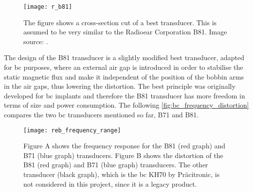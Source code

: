  \begin{figure}[H]
	\centering
		\texttt{[image: r\_b81]}
		\caption{The figure shows a cross-section cut of a \gls{best} transducer. This is assumed to be very similar to the Radioear Corporation B81. Image source:  \citep{the_balanced_2003}.}
		\label{fig:r_b81}
\end{figure}

The design of the B81 transducer is a slightly modified \gls{best} transducer, adapted for \gls{bc} purposes, where an external air gap is introduced in order to stabilise the static magnetic flux and make it independent of the position of the bobbin arms in the air gaps, thus lowering the distortion.  The \gls{best} principle was originally developed for \gls{bc} implants and therefore the B81 transducer has more freedom in terms of size and power consumption. The following \autoref{fig:bc_frequency_distortion} compares the two \gls{bc} transducers mentioned so far, B71 and B81.


\begin{figure}[H]
	\centering
		\texttt{[image: reb\_frequency\_range]}
		\caption{Figure A shows the frequency response for the B81 (red graph) and B71 (blue graph) transducers. Figure B shows the distortion of the  B81 (red graph) and B71 (blue graph) transducers. The other transducer (black graph), which is the \gls{bc} KH70 by Pr\"acitronic, is not considered in this project, since it is a legacy product.}
		\label{fig:bc_frequency_distortion}
\end{figure}




